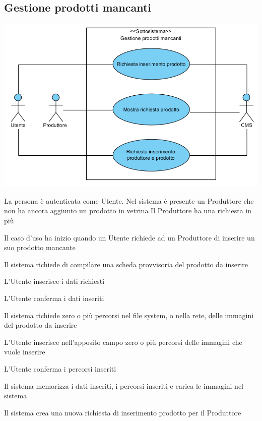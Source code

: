 \subsection{Gestione prodotti mancanti}
\begin{center}
   \includegraphics[width=\textwidth]{assets/visualParadigm/cu/GestioneProdottiMancanti}
\end{center}
{}
{La persona è autenticata come Utente. Nel sistema è presente un Produttore che non ha ancora aggiunto un prodotto in vetrina}
{Il Produttore ha una richiesta in più}
{\begin{enumCU}
		\item Il caso d'uso ha inizio quando un Utente richiede ad un Produttore di inserire un suo prodotto mancante
		\item Il sistema richiede di compilare una scheda provvisoria del prodotto da inserire
		\item L'Utente inserisce i dati richiesti \label{curicinsimmpro:1}
		\item L'Utente conferma i dati inseriti 
		\item Il sistema richiede zero o più percorsi nel file system, o nella rete, delle immagini del prodotto da inserire
		\item L'Utente inserisce nell'apposito campo zero o più percorsi delle immagini che vuole inserire \label{curicinsimmpro:2}
		\item L'Utente conferma i percorsi inseriti \label{curicinsimmpro:3}
		\item Il sistema memorizza i dati inseriti, i percorsi inseriti e carica le immagini nel sistema
		\item Il sistema crea una nuova richiesta di inserimento prodotto per il Produttore
	\end{enumCU}}
